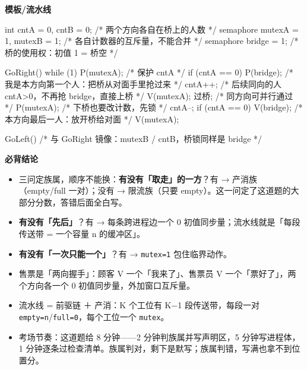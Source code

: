 \documentclass[10pt,a4paper]{ctexart}
\begin{document}
\textbf{模板/流水线}

\begin{codebox}
int cntA = 0, cntB = 0;           /* 两个方向各自在桥上的人数 */
semaphore mutexA = 1, mutexB = 1; /* 各自计数器的互斥量，不能合并 */
semaphore bridge = 1;             /* 桥的使用权：初值 1 = 桥空 */

GoRight() { while (1) {
    P(mutexA);                    /* 保护 cntA */
    if (cntA == 0) P(bridge);     /* 我是本方向第一个人：把桥从对面手里抢过来 */
    cntA++;                       /* 后续同向的人 cntA>0，不再抢 bridge，直接上桥 */
    V(mutexA);
    过桥;                          /* 同方向可并行通过 */
    P(mutexA);                    /* 下桥也要改计数，先锁 */
    cntA--;
    if (cntA == 0) V(bridge);     /* 本方向最后一人：放开桥给对面 */
    V(mutexA);
} }

GoLeft() { /* 与 GoRight 镜像：mutexB / cntB，桥锁同样是 bridge */ }
\end{codebox}




\textbf{必背结论}

\begin{itemize}

\item 三问定族属，顺序不能换：\textbf{有没有「取走」的一方}？有 → 产消族（empty/full 一对）；没有 → 限流族（只要 empty）。这一问定了这道题的大部分分数，答错后面全白写。

\item \textbf{有没有「先后」}？有 → 每条跨进程边一个 0 初值同步量；流水线就是「每段传送带 = 一个容量 n 的缓冲区」。

\item \textbf{有没有「一次只能一个」}？有 → \texttt{mutex=1} 包住临界动作。

\item 售票是「两向握手」：顾客 V 一个「我来了」、售票员 V 一个「票好了」，两个方向各一个 0 初值同步量，外加窗口互斥量。

\item 流水线 = 前驱链 ＋ 产消：K 个工位有 K−1 段传送带，每段一对 \texttt{empty=n}/\texttt{full=0}，每个工位一个 \texttt{mutex}。

\item 考场节奏：这道题给 8 分钟——2 分钟判族属并写声明区，5 分钟写进程体，1 分钟逐条过检查清单。族属判对，剩下是默写；族属判错，写满也拿不到位置分。

\end{itemize}
\end{document}
